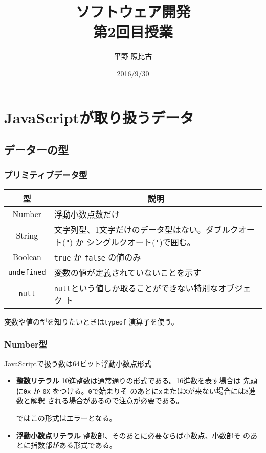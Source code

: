
\title{ソフトウェア開発\\第2回目授業}
\author{平野 照比古}
\institute{}
\date{2016/9/30}

\frame{\maketitle}
\section{JavaScriptが取り扱うデータ}
\subsection{データーの型}
\begin{frame}[containsverbatim]
 \frametitle{プリミティブデータ型}
\begin{tabular}{|c|m{}|}\hline
 型&\multicolumn{1}{c|}{説明} \\\hline
 Number & 浮動小数点数だけ\\ \hline
 String & 文字列型、1文字だけのデータ型はない。ダブルクオート(\Verb+"+)
     か%
     シングルクオート(\Verb+'+)で囲む。\\ \hline
 Boolean& \Verb+true+ か \Verb+false+ の値のみ\\ \hline
 \Verb+undefined+ & 変数の値が定義されていないことを示す\\ \hline
 \Verb+null+& \Verb+null+という値しか取ることができない特別なオブジェク
     ト\\ \hline
\end{tabular}

変数や値の型を知りたいときは\Verb+typeof+ 演算子を使う。
\end{frame}
\begin{frame}[containsverbatim]
 \frametitle{Number型}
JavaScriptで扱う数は64ビット浮動小数点形式
\begin{itemize}
 \item{\bfseries 整数リテラル} 10進整数は通常通りの形式である。16進数を表す場合は
	      先頭に\Verb+0x+ か \Verb+0X+ をつける。\Verb+0+で始まりそ
	      のあとに\Verb+x+または\Verb+X+が来ない場合には8進数と解釈
      される場合があるので注意が必要である。

      \Strict ではこの形式はエラーとなる。
 \item{\bfseries 浮動小数点リテラル} 整数部、そのあとに必要ならば小数点、小数部そ
       のあとに指数部がある形式である。
\end{itemize}
\end{frame}
